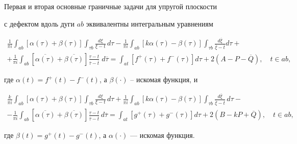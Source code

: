 \begin{thm}


Первая и вторая основные граничные задачи для упругой плоскости


с дефектом вдоль дуги $ab$ эквивалентны интегральным уравнениям


\begin{multline}


\frac{1}{\pi i}\int_{ab} [\alpha(\tau)+\beta(\tau)]


\int_{\tau b}\frac{d\xi}{\xi-t}\,d\tau


- \frac{1}{\pi i}\int_{ab} [k\alpha(\tau)-\beta(\tau)]


\int_{\tau b}\frac{d\overline{\xi}}{\overline{\xi}


-\overline{t}}d\tau + \\


%


+ \frac{1}{\pi i}\int_{ab} [\overline{\alpha(\tau)}


+\overline{\beta(\tau)}]


\frac{\tau-t}{\overline{\tau}-\overline{t}}\;d\overline{\tau}


= \int_{at} [f^+(\tau)+f^-(\tau)]d\tau + 2(A-P-\overline{Q}),


\quad t\in ab,


\end{multline}


где $\alpha(t)=f^+(t)-f^-(t)$, а $\beta(\cdot)$ -- искомая функция, и


\begin{multline}


\frac{k}{\pi i}\int_{ab} [\alpha(\tau)+\beta(\tau)]


\int_{\tau b}\frac{d\xi}{\xi-t}\,d\tau


+ \frac{1}{\pi i}\int_{ab} [k\alpha(\tau)-\beta(\tau)]


\int_{\tau b}\frac{d\overline{\xi}}{\overline{\xi}-\overline{t}}\,


d\tau - \\


%


- \frac{1}{\pi i}\int_{ab} [\overline{\alpha(\tau)}


+\overline{\beta(\tau)}]


\frac{\tau-t}{\overline{\tau}-\overline{t}}\,d\overline{\tau}


= \int_{at} [g^+(\tau)+g^-(\tau)]d\tau + 2(B-kP+\overline{Q}),


\quad t\in ab ,


\end{multline}


где $\beta(t)=g^+(t)-g^-(t)$, а $\alpha(\cdot)$ --- искомая функция.


\end{thm}





